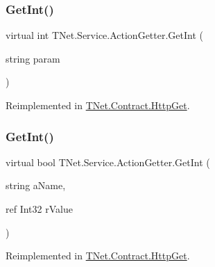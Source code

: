 \subsubsection{\texorpdfstring{Get\+Int()}{GetInt()}\hspace{0.1cm}{\footnotesize\ttfamily [1/5]}}
{\footnotesize\ttfamily virtual int T\+Net.\+Service.\+Action\+Getter.\+Get\+Int (\begin{DoxyParamCaption}\item[{string}]{param }\end{DoxyParamCaption})\hspace{0.3cm}{\ttfamily [virtual]}}







Reimplemented in \mbox{\hyperlink{class_t_net_1_1_contract_1_1_http_get_a0a566eefd2751c74d79360fe8bfdb397}{T\+Net.\+Contract.\+Http\+Get}}.

\mbox{\label{class_t_net_1_1_service_1_1_action_getter_a9bd24ed11677a2ea2a872a429d083e01}} 
\subsubsection{\texorpdfstring{Get\+Int()}{GetInt()}\hspace{0.1cm}{\footnotesize\ttfamily [2/5]}}
{\footnotesize\ttfamily virtual bool T\+Net.\+Service.\+Action\+Getter.\+Get\+Int (\begin{DoxyParamCaption}\item[{string}]{a\+Name,  }\item[{ref Int32}]{r\+Value }\end{DoxyParamCaption})\hspace{0.3cm}{\ttfamily [virtual]}}







Reimplemented in \mbox{\hyperlink{class_t_net_1_1_contract_1_1_http_get_ab550a50c4f847e11b4f14bbdcc8b53cf}{T\+Net.\+Contract.\+Http\+Get}}.

\mbox{\label{class_t_net_1_1_service_1_1_action_getter_a5e4ca4b5e0cd7bfcf76f96b6b546554a}} 
